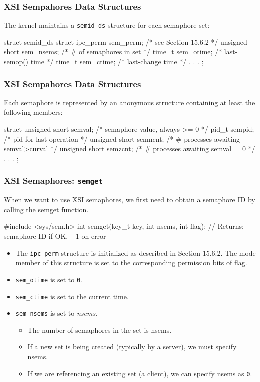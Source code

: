 \documentclass[newPxFont,sthlmFooter,nooffset]{beamer}
\begin{document}
\begin{frame}[t, fragile]
  \frametitle{XSI Sempahores Data Structures}
The kernel maintains a \texttt{semid\_ds} structure for each semaphore set:
\begin{codedefnb}
struct semid_ds {
     struct ipc_perm  sem_perm;  /* see Section 15.6.2 */
     unsigned short   sem_nsems; /* # of semaphores in set */
     time_t           sem_otime; /* last-semop() time */
     time_t           sem_ctime; /* last-change time */
     .
     .
     .
};
\end{codedefnb}
\end{frame}



\begin{frame}[t, fragile]
  \frametitle{XSI Sempahores Data Structures}
Each semaphore is represented by an anonymous structure containing at least the following members:
\begin{codedefnb}
struct {
     unsigned short  semval;   /* semaphore value, always >= 0 */
     pid_t           sempid;   /* pid for last operation */
     unsigned short  semncnt;  /* # processes awaiting semval>curval */
     unsigned short  semzcnt;  /* # processes awaiting semval==0 */
     .
     .
     .
};
\end{codedefnb}
\end{frame}



\begin{frame}[t, fragile]
  \frametitle{XSI Semaphores: \texttt{semget}}
When we want to use XSI semaphores, we first need to obtain a semaphore ID by
calling the semget function.

\begin{codedef}
#include <sys/sem.h>
int semget(key_t key, int nsems, int flag);
// Returns: semaphore ID if OK, −1 on error
\end{codedef}
\begin{itemize}
\item The \texttt{ipc\_perm} structure is initialized as described in Section 15.6.2. The mode member of this structure is set to the corresponding permission bits of flag.
\item \texttt{sem\_otime} is set to \texttt{0}.
\item \texttt{sem\_ctime} is set to the current time.
\item \texttt{sem\_nsems} is set to \textit{nsems}.
  \begin{itemize}
  \item The number of semaphores in the set is nsems.
  \item If a new set is being created (typically by a server), we must specify nsems.
  \item If we are referencing an existing set (a client), we can specify nsems as \texttt{0}.
  \end{itemize}

\end{itemize}
\end{frame}
\end{document}
